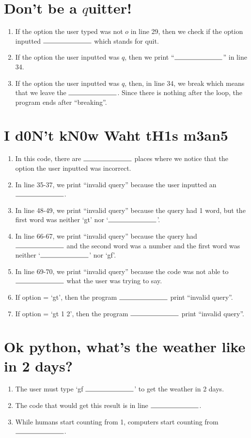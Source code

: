 \documentclass[11pt]{article}
\begin{document}
\section{Don't be a $q$uitter!}
\begin{enumerate}
    \item If the option the user typed was not $o$ in line 29, then we check if the option inputted $\rule{2.5cm}{0.15mm}$ which stands for quit.
    \item If the option the user inputted was $q$, then we print ``$\rule{2.5cm}{0.15mm}$'' in line 34.
    \item If the option the user inputted was $q$, then, in line 34, we break which means that we leave the $\rule{2.5cm}{0.15mm}$. Since there is nothing after the loop, the program ends after ``breaking''.
\end{enumerate}
\noindent\makebox[\linewidth]{\rule{\paperwidth}{0.4pt}}
\section{I d0N't kN0w Waht tH1s m3an5}
\begin{enumerate}
    \item In this code, there are $\rule{2.5cm}{0.15mm}$ places where we notice that the option the user inputted was incorrect.
    \item In line 35-37, we print ``invalid query'' because the user inputted an $\rule{2.5cm}{0.15mm}$.
    \item In line 48-49, we print ``invalid query'' because the query had 1 word, but the first word was neither `gt' nor `$\rule{2.5cm}{0.15mm}$'.
    \item In line 66-67, we print ``invalid query'' because the query had $\rule{2.5cm}{0.15mm}$ and the second word was a number and the first word was neither `$\rule{2.5cm}{0.15mm}$' nor `gf'.
    \item In line 69-70, we print ``invalid query'' because the code was not able to $\rule{2.5cm}{0.15mm}$ what the user was trying to say.
    \item If option = `gt', then the program $\rule{2.5cm}{0.15mm}$ print ``invalid query''.
    \item If option = `gt 1 2', then the program $\rule{2.5cm}{0.15mm}$ print ``invalid query''.
\end{enumerate}
\noindent\makebox[\linewidth]{\rule{\paperwidth}{0.4pt}}
\section{Ok python, what's the weather like in 2 days?}
\begin{enumerate}
    \item The user must type `gf $\rule{2.5cm}{0.15mm}$' to get the weather in 2 days.
    \item The code that would get this result is in line $\rule{2.5cm}{0.15mm}$.
    \item While humans start counting from 1, computers start counting from $\rule{2.5cm}{0.15mm}$.
\end{enumerate}
\end{document}
